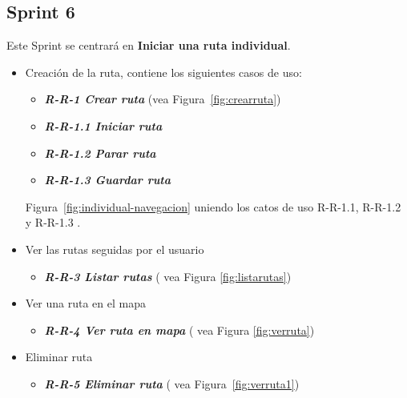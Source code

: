 \subsection{Sprint 6}
Este Sprint se centrará en \textbf{Iniciar una ruta individual}.

\begin{itemize}
\item Creación de la ruta, contiene los siguientes casos de uso:

\begin{itemize}
\item \textbf{\textit{R-R-1 Crear ruta}} (vea Figura~\ref{fig:crearruta})
\item \textbf{\textit{R-R-1.1 Iniciar ruta}}
\item\textbf{ \textit{R-R-1.2 Parar ruta}}
\item \textbf{\textit{R-R-1.3 Guardar ruta}} 
\end{itemize}
Figura~\ref{fig:individual-navegacion} uniendo los catos de uso R-R-1.1, R-R-1.2 y R-R-1.3 .
\item Ver las rutas seguidas por el usuario

\begin{itemize}
\item \textbf{\textit{R-R-3 Listar rutas} } ( vea Figura \ref{fig:listarutas})

\end{itemize}
\item Ver una ruta en el mapa 

\begin{itemize}
\item \textbf{\textit{R-R-4 Ver ruta en mapa}}  ( vea Figura \ref{fig:verruta})

\end{itemize}
\item Eliminar ruta

\begin{itemize}
\item \textbf{\textit{R-R-5 Eliminar ruta}} ( vea Figura~\ref{fig:verruta1})

\end{itemize}

\end{itemize}








